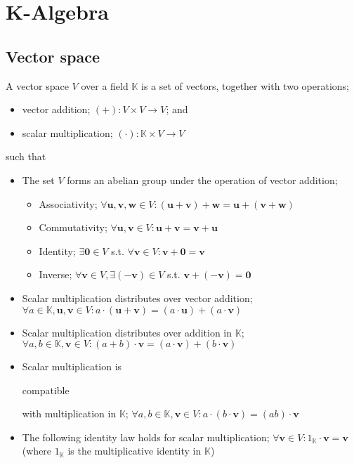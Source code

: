 \documentclass{article}
\newenvironment{itemized}{ 
\begin{itemize}
\setlength{\itemsep}{0pt}
\setlength{\parskip}{0pt}
\setlength{\parsep}{0pt}     
}{\end{itemize}}
\renewcommand{\vec}[1]{\mathbf{#1}}
\begin{document}
\section*{K-Algebra}

\subsection*{Vector space}

A vector space $V$ over a field $\mathbb{K}$ is a set of vectors, together with two operations; 

  \begin{itemized}
    \item vector addition; $ (+) : V \times V \rightarrow V $; and
    \item scalar multiplication; $ (\cdot) : \mathbb{K} \times V \rightarrow V $
  \end{itemized}

such that 
  
  \begin{itemized}
    \item The set $V$ forms an abelian group under the operation of vector addition;
      \begin{itemized}
        \item Associativity; $ \forall \vec{u}, \vec{v}, \vec{w} \in V : (\vec{u} + \vec{v}) + \vec{w} = \vec{u} + (\vec{v} + \vec{w}) $
        \item Commutativity; $ \forall \vec{u}, \vec{v} \in V : \vec{u} + \vec{v} = \vec{v} + \vec{u} $
        \item Identity; $ \exists \vec{0} \in V $ s.t. $ \forall \vec{v} \in V : \vec{v} + \vec{0} = \vec{v} $
        \item Inverse; $ \forall \vec{v} \in V, \exists \vec{(-v)} \in V $ s.t. $ \vec{v} + \vec{(-v)} = \vec{0} $
      \end{itemized}
    \item Scalar multiplication distributes over vector addition; $ \forall a \in \mathbb{K}, \vec{u}, \vec{v} \in V : a \cdot (\vec{u} + \vec{v}) = (a \cdot \vec{u}) + (a \cdot \vec{v}) $
    \item Scalar multiplication distributes over addition in $\mathbb{K}$; $ \forall a, b \in \mathbb{K}, \vec{v} \in V : (a + b) \cdot \vec{v} = (a \cdot \vec{v}) + (b \cdot \vec{v}) $
    \item Scalar multiplication is \begin{em}compatible\end{em} with multiplication in $\mathbb{K}$; $ \forall a,b \in \mathbb{K}, \vec{v} \in V : a \cdot (b \cdot \vec{v}) = (ab) \cdot \vec{v} $ 
    \item The following identity law holds for scalar multiplication; $ \forall \vec{v} \in V : 1_{\mathbb{K}} \cdot \vec{v} = \vec{v} $ (where $1_{\mathbb{K}}$ is the multiplicative identity in $\mathbb{K}$)
  \end{itemized}
\end{document}
